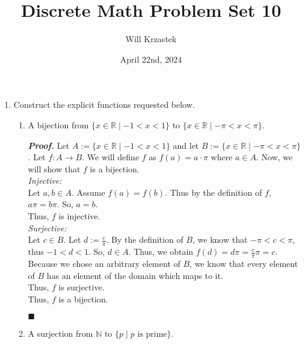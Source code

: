 \documentclass[11pt,a4paper]{article}
\begin{document}
 
\title{Discrete Math Problem Set 10}
\author{Will Krzastek}
\date{April 22nd, 2024}
\maketitle

\begin{enumerate}

    \item 
    Construct the explicit functions requested below. 
    \begin{enumerate}

        \item 
        A bijection from $\{x \in \mathbb{R} \mid -1 < x < 1 \} $ to $\{x \in \mathbb{R} \mid -\pi < x < \pi \} $. 

        \emph{\textbf{Proof.}} Let $A := \{x \in \mathbb{R} \mid -1 < x <1 \} $ and let $B := \{x \in \mathbb{R} \mid -\pi < x < \pi \} $. Let $f: A \rightarrow B$. We will define $f$ as $f(a) = a \cdot \pi $ where $a \in A $. Now, we will show that $f$ is a bijection. \\
        \emph{Injective:} \\
        Let $a, b \in A$. Assume $f(a) = f(b) $. Thus by the definition of $f$, $a \pi = b \pi $. So, $a = b$. \\
        Thus, $f$ is injective. \\
        \emph{Surjective:} \\
        Let $c \in B$. Let $d := \frac{c}{\pi} $. By the definition of $B$, we know that  $-\pi < c < \pi $, thus $-1 < d < 1 $. So, $d \in A $.
        Thus, we obtain $f(d) = d \pi = \frac{c}{\pi} \pi = c$. Because we chose an arbitrary element of $B$, we know that every element of $B$ has an element of the domain which maps to it. \\
        Thus, $f$ is surjective. \\
        Thus, $f$ is a bijection.
        \begin{flushright}
            $\blacksquare$
        \end{flushright}

        \item 
        A surjection from $\mathbb{N} $ to $\{p \mid p \text{ is prime} \} $. 


\end{enumerate}
\end{enumerate}
\end{document}
